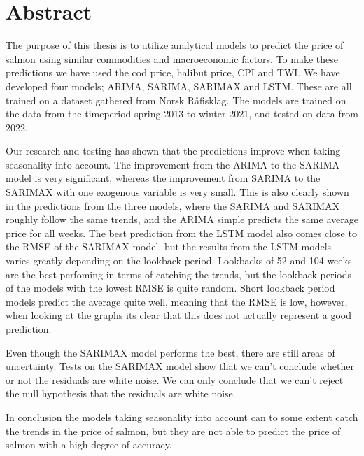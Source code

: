 \section*{Abstract}
The purpose of this thesis is to utilize analytical models to predict the price of salmon using similar commodities and macroeconomic factors. To make these predictions we have used the cod price, halibut price, CPI and TWI. We have developed four models; ARIMA, SARIMA, SARIMAX and LSTM. These are all trained on a dataset gathered from Norsk Råfisklag. The models are trained on the data from the timeperiod spring 2013 to winter 2021, and tested on data from 2022. 

Our research and testing has shown that the predictions improve when taking seasonality into account. The improvement from the ARIMA to the SARIMA model is very significant, whereas the improvement from SARIMA to the SARIMAX with one exogenous variable is very small. This is also clearly shown in the predictions from the three models, where the SARIMA and SARIMAX roughly follow the same trends, and the ARIMA simple predicts the same average price for all weeks. The best prediction from the LSTM model also comes close to the RMSE of the SARIMAX model, but the results from the LSTM models varies greatly depending on the lookback period. Lookbacks of 52 and 104 weeks are the best perfoming in terms of catching the trends, but the lookback periods of the models with the lowest RMSE is quite random. Short lookback period models predict the average quite well, meaning that the RMSE is low, however, when looking at the graphs its clear that this does not actually represent a good prediction. 

Even though the SARIMAX model performs the best, there are still areas of uncertainty. Tests on the SARIMAX model show that we can't conclude whether or not the residuals are white noise. We can only conclude that we can't reject the null hypothesis that the residuals are white noise.  

In conclusion the models taking seasonality into account can to some extent catch the trends in the price of salmon, but they are not able to predict the price of salmon with a high degree of accuracy. 